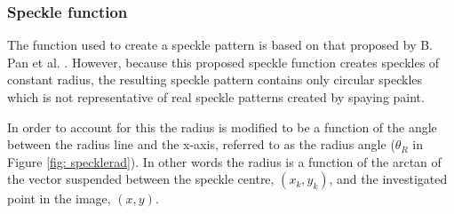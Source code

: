 \documentclass[12pt,oneside,openany,a4paper, %
english, %
masters-t, goldenblock]{usthesis}
\begin{document}

\subsubsection{Speckle function}
The function used to create a speckle pattern is based on that proposed by B. Pan et al. \cite{bing2006performance}. However, because this proposed speckle function creates speckles of constant radius, the resulting speckle pattern contains only circular speckles which is not representative of real speckle patterns created by spaying paint. 

In order to account for this the radius is modified to be a function of the angle between the radius line and the x-axis, referred to as the radius angle ($\theta_R$ in Figure \ref{fig: specklerad}). In other words the radius is a function of the arctan of the vector suspended between the speckle centre, $(x_k,y_k)$, and the investigated point in the image, $(x,y)$. 
\end{document}
